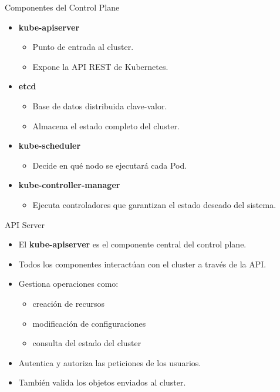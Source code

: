 \documentclass{beamer}
\begin{document}
\begin{frame}{Componentes del Control Plane}
\begin{itemize}
\item \textbf{kube-apiserver}
\begin{itemize}
\item Punto de entrada al cluster.
\item Expone la API REST de Kubernetes.
\end{itemize}

\item \textbf{etcd}
\begin{itemize}
\item Base de datos distribuida clave-valor.
\item Almacena el estado completo del cluster.
\end{itemize}

\item \textbf{kube-scheduler}
\begin{itemize}
\item Decide en qué nodo se ejecutará cada Pod.
\end{itemize}

\item \textbf{kube-controller-manager}
\begin{itemize}
\item Ejecuta controladores que garantizan el estado deseado del sistema.
\end{itemize}
\end{itemize}
\end{frame}

\begin{frame}{API Server}
\begin{itemize}
\item El \textbf{kube-apiserver} es el componente central del control plane.
\item Todos los componentes interactúan con el cluster a través de la API.
\item Gestiona operaciones como:
\begin{itemize}
\item creación de recursos
\item modificación de configuraciones
\item consulta del estado del cluster
\end{itemize}
\item Autentica y autoriza las peticiones de los usuarios.
\item También valida los objetos enviados al cluster.
\end{itemize}
\end{frame}
\end{document}

